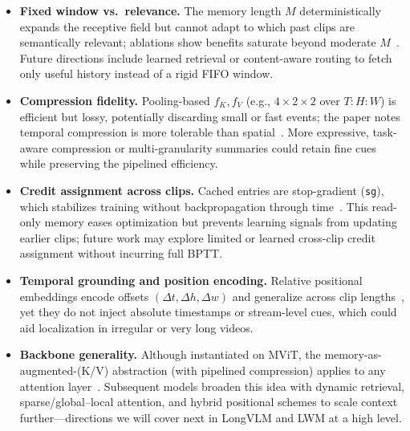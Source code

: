 \begin{enrichment}
\begin{enrichment}
        \begin{itemize}
            \item \textbf{Fixed window vs.\ relevance.} The memory length $M$ deterministically expands the receptive field but cannot adapt to which past clips are semantically relevant; ablations show benefits saturate beyond moderate $M$~\cite[Sec.~4.1; Table~1(a)]{wu2022_memvit}. Future directions include learned retrieval or content-aware routing to fetch only useful history instead of a rigid FIFO window.
            \item \textbf{Compression fidelity.} Pooling-based $f_K,f_V$ (e.g., $4{\times}2{\times}2$ over $T{:}H{:}W$) is efficient but lossy, potentially discarding small or fast events; the paper notes temporal compression is more tolerable than spatial~\cite[Sec.~4.2; Table~1(b)]{wu2022_memvit}. More expressive, task-aware compression or multi-granularity summaries could retain fine cues while preserving the pipelined efficiency.
            \item \textbf{Credit assignment across clips.} Cached entries are stop-gradient (\texttt{sg}), which stabilizes training without backpropagation through time~\cite[Sec.~4.1]{wu2022_memvit}. This read-only memory eases optimization but prevents learning signals from updating earlier clips; future work may explore limited or learned cross-clip credit assignment without incurring full BPTT.
            \item \textbf{Temporal grounding and position encoding.} Relative positional embeddings encode offsets $(\Delta t,\Delta h,\Delta w)$ and generalize across clip lengths~\cite[Sec.~4.3]{li2021_improved_mvit,wu2022_memvit}, yet they do not inject absolute timestamps or stream-level cues, which could aid localization in irregular or very long videos.
            \item \textbf{Backbone generality.} Although instantiated on MViT, the memory-as-augmented-(K/V) abstraction (with pipelined compression) applies to any attention layer~\cite[Sec.~4.1]{wu2022_memvit}. Subsequent models broaden this idea with dynamic retrieval, sparse/global–local attention, and hybrid positional schemes to scale context further—directions we will cover next in LongVLM and LWM at a high level.
        \end{itemize}
        
    \end{enrichment}
    
    \newpage
    
    \begin{enrichment}
        \label{enr:subsec_chapter24_longvlm}
        

\end{enrichment}
\end{enrichment}

